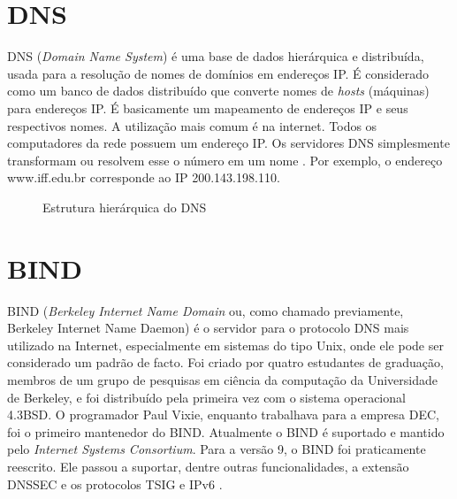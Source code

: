 \section{DNS}

DNS (\textit{Domain Name System}) é uma base de dados hierárquica e distribuída, usada para a resolução de nomes de domínios em endereços IP. É considerado como um banco de dados distribuído que converte nomes de \textit{hosts} (máquinas) para endereços IP. É basicamente um mapeamento de endereços IP e seus respectivos nomes. A utilização mais comum é na internet. Todos os computadores da rede possuem um endereço IP. Os servidores DNS simplesmente transformam ou resolvem esse o número em um nome \cite{SCRIMER}. Por exemplo, o endereço www.iff.edu.br corresponde ao IP 200.143.198.110. 

\begin{figure}[ht]
   	\centering
   	\caption{Estrutura hierárquica do DNS \cite{DNS}}
    \label{dns}
\end{figure}

\section{BIND}


BIND (\textit{Berkeley Internet Name Domain} ou, como chamado previamente, Berkeley Internet Name Daemon) é o servidor para o protocolo DNS mais utilizado na Internet, especialmente em sistemas do tipo Unix, onde ele pode ser considerado um padrão de facto. Foi criado por quatro estudantes de graduação, membros de um grupo de pesquisas em ciência da computação da Universidade de Berkeley, e foi distribuído pela primeira vez com o sistema operacional 4.3BSD. O programador Paul Vixie, enquanto trabalhava para a empresa DEC, foi o primeiro mantenedor do BIND. Atualmente o BIND é suportado e mantido pelo \textit{Internet Systems Consortium}.
Para a versão 9, o BIND foi praticamente reescrito. Ele passou a suportar, dentre outras funcionalidades, a extensão DNSSEC e os protocolos TSIG e IPv6 \cite{BIND}.

